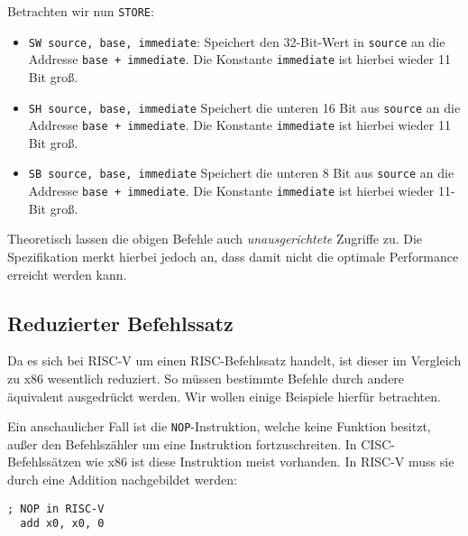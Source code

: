 Betrachten wir nun \lstinline[style=risc-v_Assembler]!STORE!:

\begin{itemize}
  \item \lstinline[style=risc-v_Assembler]!SW source, base, immediate!: Speichert den 32-Bit-Wert in \lstinline[style=risc-v_Assembler]!source!
    an die Addresse \lstinline[style=risc-v_Assembler]!base + immediate!. Die Konstante \lstinline[style=risc-v_Assembler]!immediate! ist
    hierbei wieder 11 Bit groß.
  \item \lstinline[style=risc-v_Assembler]!SH source, base, immediate! Speichert die unteren 16 Bit aus \lstinline[style=risc-v_Assembler]!source! an die Addresse
    \lstinline[style=risc-v_Assembler]!base + immediate!. Die Konstante \lstinline[style=risc-v_Assembler]!immediate! ist hierbei wieder
    11 Bit groß.
  \item \lstinline[style=risc-v_Assembler]!SB source, base, immediate! Speichert die unteren 8 Bit aus \lstinline[style=risc-v_Assembler]!source! an die Addresse
    \lstinline[style=risc-v_Assembler]!base + immediate!. Die Konstante \lstinline[style=risc-v_Assembler]!immediate! ist hierbei wieder
    11-Bit groß.
\end{itemize}

Theoretisch lassen die obigen Befehle auch \emph{unausgerichtete}
Zugriffe zu. Die Spezifikation merkt hierbei jedoch an,
dass damit nicht die optimale Performance erreicht werden kann.

\subsection{Reduzierter Befehlssatz}

Da es sich bei RISC-V um einen RISC-Befehlssatz handelt, ist dieser im Vergleich
zu x86 wesentlich reduziert. So müssen bestimmte Befehle durch andere äquivalent
ausgedrückt werden. Wir wollen einige Beispiele hierfür betrachten.

Ein anschaulicher Fall ist die \lstinline[style=x86Assembler]!NOP!-Instruktion, welche keine Funktion
besitzt, außer den Befehlszähler um eine Instruktion fortzuschreiten. In CISC-Befehlssätzen
wie x86 ist diese Instruktion meist vorhanden. In RISC-V muss sie
durch eine Addition nachgebildet werden:

\begin{lstlisting}[style=risc-v_Assembler]
  ; NOP in RISC-V
  add x0, x0, 0
\end{lstlisting}


